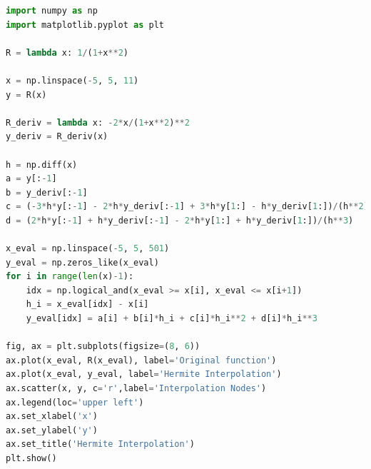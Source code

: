 \documentclass[a4paper,11pt,notitlepage]{article}
\begin{document}
\begin{lstlisting}[language=Python,caption={Fourth Week 1E 2.py},label={code5.2}]
import numpy as np
import matplotlib.pyplot as plt

R = lambda x: 1/(1+x**2)

x = np.linspace(-5, 5, 11)
y = R(x)

R_deriv = lambda x: -2*x/(1+x**2)**2
y_deriv = R_deriv(x)

h = np.diff(x)
a = y[:-1]
b = y_deriv[:-1]
c = (-3*h*y[:-1] - 2*h*y_deriv[:-1] + 3*h*y[1:] - h*y_deriv[1:])/(h**2)
d = (2*h*y[:-1] + h*y_deriv[:-1] - 2*h*y[1:] + h*y_deriv[1:])/(h**3)

x_eval = np.linspace(-5, 5, 501)
y_eval = np.zeros_like(x_eval)
for i in range(len(x)-1):
    idx = np.logical_and(x_eval >= x[i], x_eval <= x[i+1])
    h_i = x_eval[idx] - x[i]
    y_eval[idx] = a[i] + b[i]*h_i + c[i]*h_i**2 + d[i]*h_i**3

fig, ax = plt.subplots(figsize=(8, 6))
ax.plot(x_eval, R(x_eval), label='Original function')
ax.plot(x_eval, y_eval, label='Hermite Interpolation')
ax.scatter(x, y, c='r',label='Interpolation Nodes')
ax.legend(loc='upper left')
ax.set_xlabel('x')
ax.set_ylabel('y')
ax.set_title('Hermite Interpolation')
plt.show()
\end{lstlisting}
\end{document}
